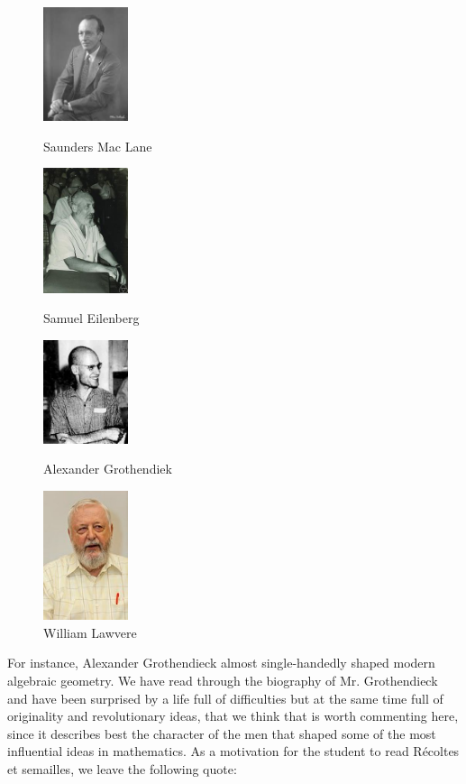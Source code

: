 \begin{figure}[H]
\centering
\begin{minipage}{0.10\textwidth}
\centering
\includegraphics[width=2.5cm]{images/maclane.jpeg}
\caption*{Saunders Mac Lane}
\end{minipage}\hfill
\begin{minipage}{0.10\textwidth}
\centering
\includegraphics[width=2.5cm]{images/eilenberg.jpeg}
\caption*{Samuel Eilenberg}
\end{minipage}\hfill
\begin{minipage}{0.10\textwidth}
\centering
\includegraphics[width=2.5cm]{images/grothendiek.jpeg}
\caption*{Alexander Grothendiek}
\end{minipage}\hfill
\begin{minipage}{0.10\textwidth}
\centering
\includegraphics[width=2.5cm]{images/lawvere.jpeg}
\caption*{William Lawvere}
\end{minipage}\hfill
\end{figure}

For instance,  Alexander Grothendieck almost single-handedly shaped modern algebraic geometry. We have read through the biography of Mr. Grothendieck and have been surprised by a life full of difficulties but at the same time full of originality and revolutionary ideas, that we think that is worth commenting here, since it describes best the character of the men that shaped some of the most influential ideas in mathematics. As a motivation for the student to read Récoltes et semailles, we leave the following quote:

